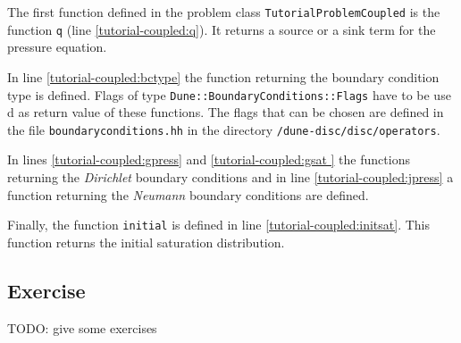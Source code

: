 The first function defined in the problem class \texttt{TutorialProblemCoupled} is the function \texttt{q} (line \ref{tutorial-coupled:q}). It returns a source or a sink term for the pressure equation.

In line \ref{tutorial-coupled:bctype} the function returning the boundary condition type is defined. 
Flags of type \texttt{Dune::BoundaryConditions::Flags} have to be use
d as return value of these functions. The flags that can be chosen are defined in the file \texttt{boundaryconditions.hh} in the directory \texttt
{/dune-disc/disc/operators}.

In lines \ref{tutorial-coupled:gpress} and \ref{tutorial-coupled:gsat
} the functions returning the \textit{Dirichlet} boundary conditions and
in line \ref{tutorial-coupled:jpress} a function returning the \textit{
Neumann} boundary conditions are defined.

Finally, the function \texttt{initial} is defined in line \ref{tutorial-coupled:initsat}. This function returns the initial saturation distribution.

\subsection{Exercise}
TODO: give some exercises

